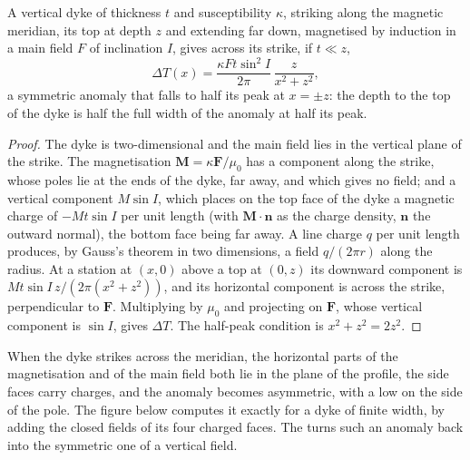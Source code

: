 \begin{proposition}\label{prop:b3:field-lab-methods-3:dyke}
A vertical dyke of thickness $t$ and susceptibility $\kappa$, striking
along the magnetic meridian, its top at depth $z$ and extending far
down, magnetised by induction in a main field $F$ of inclination $I$,
gives across its strike, if $t \ll z$,
\[
\Delta T(x) = \frac{\kappa F t\sin^2 I}{2\pi}\,\frac{z}{x^2 + z^2} ,
\]
a symmetric anomaly that falls to half its peak at $x = \pm z$: the
depth to the top of the dyke is half the full width of the anomaly at
half its peak.
\end{proposition}

\begin{proof}
The dyke is two-dimensional and the main field lies in the vertical
plane of the strike. The magnetisation $\mathbf{M} = \kappa\mathbf{F}/\mu_0$
has a component along the strike, whose poles lie at the ends of the
dyke, far away, and which gives no field; and a vertical component $M
\sin I$, which places on the top face of the dyke a magnetic charge of
$-Mt\sin I$ per unit length (with $\mathbf{M}\cdot\mathbf{n}$ as the
charge density, $\mathbf{n}$ the outward normal), the bottom face being
far away. A line charge $q$ per unit length produces, by Gauss's
theorem in two dimensions, a field $q/(2\pi r)$ along the radius. At a
station at $(x, 0)$ above a top at $(0, z)$ its downward component is
$Mt\sin I\,z/(2\pi(x^2 + z^2))$, and its horizontal component is
across the strike, perpendicular to $\mathbf{F}$. Multiplying by
$\mu_0$ and projecting on $\mathbf{F}$, whose vertical component is
$\sin I$, gives $\Delta T$. The half-peak condition is $x^2 + z^2 =
2z^2$.
\end{proof}

When the dyke strikes across the meridian, the horizontal parts of the
magnetisation and of the main field both lie in the plane of the
profile, the side faces carry charges, and the anomaly becomes
asymmetric, with a low on the side of the pole. The figure below
computes it exactly for a dyke of finite width, by adding the closed
fields of its four charged faces. The  turns such
an anomaly back into the symmetric one of a vertical field.

